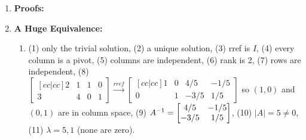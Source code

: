 {\begin{multicols}{2}
\begin{enumerate}
\begin{enumerate}
  \item 
  $|A| = 0$, row 3 is twice row 1. Since the determinant is zero, there is no inverse.
  
  
  \item The matrix of cofactors is
  $C_{ij} = 
\begin{bmatrix}
 6 & -2 & -13 \\
 -4 & 2 & 9 \\
 0 & 0 & 1
\end{bmatrix}
$. 
The adjoint is
  $\text{adj}(A) = 
\begin{bmatrix}
 6 & -4 & 0 \\
 -2 & 2 & 0 \\
 -13 & 9 & 1
\end{bmatrix}
$. Determinant is $|A|=2$.  Inverse is
$\frac{1}{|A|}\text{adj}(A)=\begin{bmatrix}
 3 & -2 & 0 \\
 -1 & 1 & 0 \\
 -\frac{13}{2} & \frac{9}{2} & \frac{1}{2}
\end{bmatrix}
$.
 


\item Each row sums to 2. Just compute $A(1,1,1,1)=(2,2,2,2)$ to show $\lambda =2$ is an eigenvalue corresponding to $(1,1,1,1)$.



\item The eigenvalues are $\lambda = 1, 3, 4$ with corresponding eigenvectors $(1,-1,0),(1,1,0),(0,0,1)$.  All three dot products are zero. Placing the three vectors into the columns of a matrix and reducing gives the identity, so they are independent.

\end{enumerate}


\item  \textbf{Proofs:} 


\item \textbf{A Huge Equivalence:}  
\begin{enumerate}
	\item 
	(1) only the trivial solution, 
	(2) a unique solution, 
	(3) rref is $I$,
	(4) every column is a pivot,
	(5) columns are independent,
	(6) rank is 2,
	(7) rows are independent,
	(8) 
	$
	\begin{bmatrix}[cc|cc] 2&1&1&0\\3&4&0&1\end{bmatrix}
	\xrightarrow{rref}
	\begin{bmatrix}[cc|cc] 1&0&4/5&-1/5\\0&1&-3/5&1/5\end{bmatrix}
	$ so $(1,0)$ and $(0,1)$ are in column space,
	(9) $A^{-1}= \begin{bmatrix}4/5&-1/5\\-3/5&1/5\end{bmatrix}
$,
	(10) $|A|= 5 \neq 0 $,
	(11) $\lambda = 5, 1$ (none are zero).
	

\end{enumerate}
\end{enumerate}
\end{multicols}}
